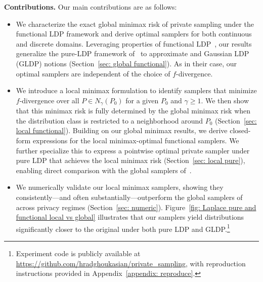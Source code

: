 \documentclass[accepted]{article}
\theoremstyle{plain} %
\theoremstyle{definition}
\theoremstyle{remark}
\begin{document}
\textbf{Contributions.} Our main contributions are as follows: 
\begin{itemize}
\item We characterize the exact global minimax risk of private sampling under the functional LDP framework and derive optimal samplers for both continuous and discrete domains. Leveraging properties of functional LDP~\citep{dong2022gaussian}, our results generalize the pure-LDP framework of~\citet{park2024exactly} to approximate and Gaussian LDP (GLDP) notions  (Section~\ref{sec: global functional}). As in their case, our optimal samplers are independent of the choice of $f$-divergence.

\item  We introduce a local minimax formulation to identify samplers that minimize $f$-divergence over all $P \in N_\gamma(P_0)$ for a given $P_0$ and $\gamma \geq 1$. We then show that this minimax risk is fully determined by the global minimax risk when the distribution class is restricted to a neighborhood around \( P_0 \) (Section~\ref{sec: local functional}). Building on our global minimax results, we derive closed-form expressions for the local minimax-optimal functional samplers. We further specialize this to express a pointwise optimal private sampler under pure LDP that achieves the local minimax risk (Section~\ref{sec: local pure}), enabling direct comparison with the global samplers of~\citet{park2024exactly}.

\item We numerically validate our local minimax samplers, showing they consistently—and often substantially—outperform the global samplers of~\citet{park2024exactly} across privacy regimes (Section~\ref{sec: numeric}). Figure~\ref{fig: Laplace pure and functional local vs global} illustrates that our samplers yield distributions significantly closer to the original under both pure LDP and GLDP.\footnote{Experiment code is publicly available at 
\url{https://github.com/hradghoukasian/private_sampling}, 
with reproduction instructions provided in Appendix~\ref{appendix: reproduce}.}


\end{itemize}
\end{document}
